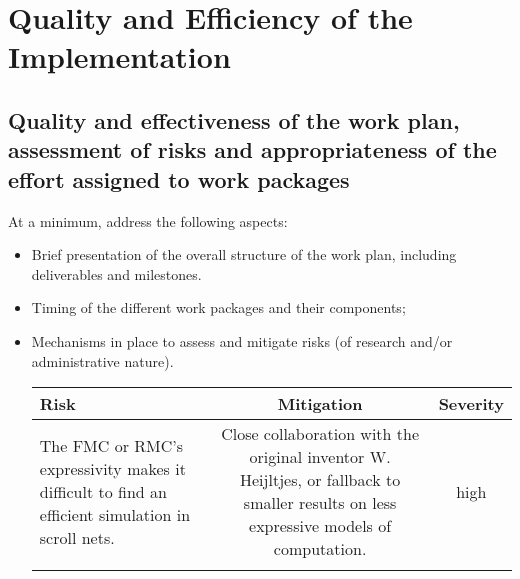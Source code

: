 \documentclass[12pt,draftproposal]{msca-pf}
\begin{document}
 

\section{Quality and Efficiency of the Implementation
            }
\label{sc:implementation}

\subsection{Quality and effectiveness of the work plan, assessment of risks and
    appropriateness of the effort assigned to work packages}
\label{ssc:implementation:workplan}

At a minimum, address the following aspects:

\begin{itemize}
    \item Brief presentation of the overall structure of the work plan,
    including deliverables and milestones.

    \item Timing of the different work packages and their components;

    \item Mechanisms in place to assess and mitigate risks (of research and/or
    administrative nature).
    
    \begin{table}[]
    \begin{tabular}{|l|c|c|}
    \hline
    \textbf{Risk}                                                                                    & \textbf{Mitigation}                                                                                                                   & \textbf{Severity} \\ \hline
    The FMC or RMC's expressivity makes it difficult to find an efficient simulation in scroll nets. & Close collaboration with the original inventor W. Heijltjes, or fallback to smaller results on less expressive models of computation. & high              \\ \hline
                                                                                                     &                                                                                                                                       &                   \\ \hline
    \end{tabular}
    \end{table}
\end{itemize}
\end{document}
